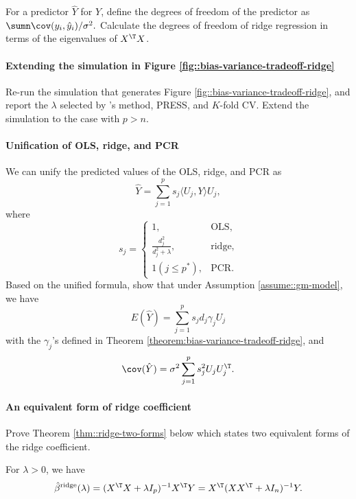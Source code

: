 For a predictor $\hat{Y}$ for $Y$, define the degrees of freedom
of the predictor as $\sumn\cov(y_{i},\hat{y}_{i}) /  \sigma^2 .$ Calculate the
degrees of freedom of ridge regression in terms of the eigenvalues
of $X^{\T}X$. 



\paragraph{Extending the simulation in Figure \ref{fig::bias-variance-tradeoff-ridge}}

Re-run the simulation that generates Figure \ref{fig::bias-variance-tradeoff-ridge}, and report the $\lambda$ selected by \citet{dempster1977simulation}'s method, PRESS, and $K$-fold CV. Extend the simulation to the case with $p>n.$




\paragraph{Unification of OLS, ridge, and PCR}\label{hw13::unification}


We can unify the predicted values of the OLS, ridge, and PCR as
$$
\hat{Y} = \sum_{j=1}^p  s_j  \langle U_j, Y \rangle U_j,
$$
where
$$
s_j  = 
\begin{cases}
1, & \text{OLS}, \\
\frac{  d_j^2 }{   d_j^2 + \lambda  },  & \text{ridge}, \\ 
1(j \leq p^*),  & \text{PCR} .
\end{cases}
$$
Based on the unified formula, show that under Assumption \ref{assume::gm-model}, we have 
$$
E (\hat{Y}  ) = \sum_{j=1}^p s_j d_j \gamma_j U_j
$$
with the $\gamma_j$'s defined in Theorem \ref{theorem:bias-variance-tradeoff-ridge}, and
$$
\cov (\hat{Y}  ) = \sigma^2  \sum_{j=1}^p  s_j^2 U_j U_j^{\T}. 
$$ 




\paragraph{An equivalent form of ridge coefficient}\label{hw13::ridge-equiv-computation}


Prove Theorem \ref{thm::ridge-two-forms} below which states two equivalent forms of the ridge coefficient.

 

\begin{theorem}\label{thm::ridge-two-forms}
For $\lambda > 0$, we have 
$$
\hat{\beta}^{\textup{ridge}}(\lambda) = 
(X^{\T}X+\lambda I_{p})^{-1}X^{\T}Y = X^{\T} (XX^{\T} + \lambda I_n)^{-1} Y.
$$
\end{theorem} 


